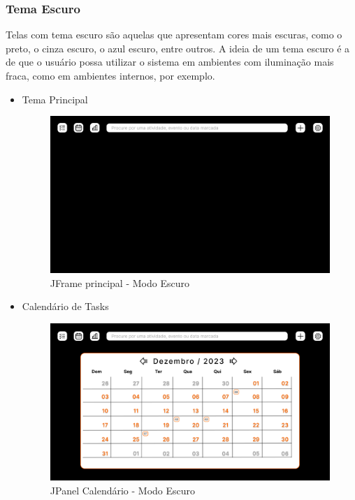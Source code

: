 \documentclass[a4paper,12pt]{article}
\begin{document}
\subsubsection{Tema Escuro}
Telas com tema escuro são aquelas que apresentam cores mais escuras, como o preto, o cinza escuro, o azul escuro, entre outros. A ideia de um tema escuro é a de que o usuário possa utilizar o sistema em ambientes com iluminação mais fraca, como em ambientes internos, por exemplo.
\begin{itemize}
	\item Tema Principal
	\begin{figure}[H]
		\centering
		\includegraphics[scale=0.20]{prototypes/dark/Main Window.png}
		\caption{JFrame principal - Modo Escuro}
	\end{figure}

	\item Calendário de Tasks
	\begin{figure}[H]
		\centering
		\includegraphics[scale=0.20]{prototypes/dark/Calendar Panel Window.png}
		\caption{JPanel Calendário - Modo Escuro}
	\end{figure}	


\end{itemize}
\end{document}
